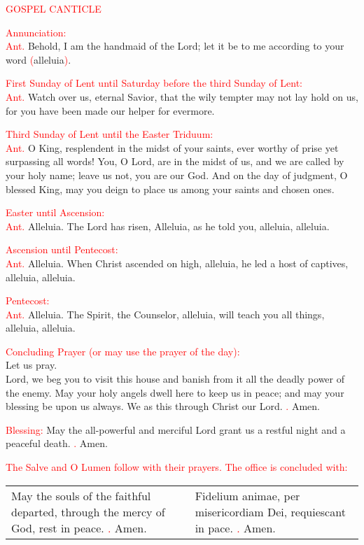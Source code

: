 \documentclass[10pt]{article}
\makeatletter
\DeclareRobustCommand{\response}{\vers@resp{0pt}{R}}
\newcommand{\vers@resp@sym}{\raisebox{0.2ex}{\rotatebox[origin=c]{-20}{$\m@th\rceil$}}}
\newcommand{\vers@resp}[2]{%
  {\ooalign{\hidewidth\kern#1\vers@resp@sym\hidewidth\cr#2\cr}}%
}
\makeatother
\begin{document}
\textcolor{red}{GOSPEL CANTICLE}

\textcolor{red}{Annunciation:} \\
\textcolor{red}{Ant.} Behold, I am the handmaid of the Lord; let it be to me according to your word \textcolor{red}{(}alleluia\textcolor{red}{)}.

\textcolor{red}{First Sunday of Lent until Saturday before the third Sunday of Lent:}\\
\textcolor{red}{Ant.} Watch over us, eternal Savior, that the wily tempter may not lay hold on us, for you have been made our helper for evermore.

\textcolor{red}{Third Sunday of Lent until the Easter Triduum:}\\
\textcolor{red}{Ant.} O King, resplendent in the midst of your saints, ever worthy of prise yet surpassing all words!
You, O Lord, are in the midst of us, and we are called by your holy name; leave us not, you are our God.
And on the day of judgment, O blessed King, may you deign to place us among your saints and chosen ones.

\textcolor{red}{Easter until Ascension:} \\
\textcolor{red}{Ant.} Alleluia. The Lord has risen, Alleluia, as he told you, alleluia, alleluia.

\textcolor{red}{Ascension until Pentecost:} \\
\textcolor{red}{Ant.} Alleluia.  When Christ ascended on high, alleluia, he led a host of captives, alleluia, alleluia.

\textcolor{red}{Pentecost:} \\
\textcolor{red}{Ant.} Alleluia.  The Spirit, the Counselor, alleluia, will teach you all things, alleluia, alleluia.

\textcolor{red}{Concluding Prayer (or may use the prayer of the day):}\\
Let us pray.\\
Lord, we beg you to visit this house and banish from it all the deadly power of the enemy.
May your holy angels dwell here to keep us in peace; and may your blessing be upon us always.
We as this through Christ our Lord.  \textcolor{red}{\response.} Amen.

\textcolor{red}{Blessing:}
May the all-powerful and merciful Lord grant us a restful night and a peaceful death.  \textcolor{red}{\response.} Amen.

\textcolor{red}{The Salve and O Lumen follow with their prayers. The office is concluded with:}\\
\begin{tabularx}{\textwidth}{X X}
  May the souls of the faithful departed, through the mercy of God, rest in peace. \textcolor{red}{\response.} Amen. &
  Fidelium animae, per misericordiam Dei, requiescant in pace.  \textcolor{red}{\response.} Amen.
\end{tabularx}
\end{document}
